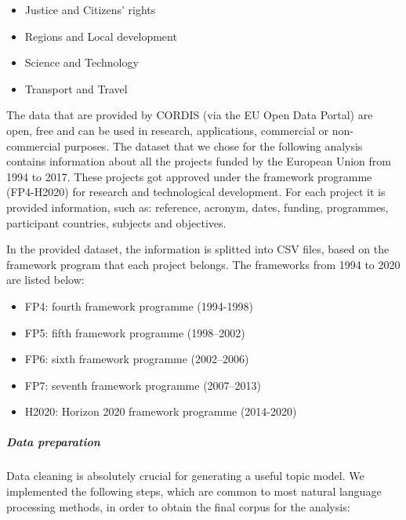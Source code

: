\documentclass[12pt]{report}
\begin{document}
\begin{itemize}
\begin{description}
	\end{description}
\item Justice and Citizens’ rights
\item Regions and Local development
\item Science and Technology
\item Transport and Travel
\end{itemize}

The data that are provided by CORDIS (via the EU Open Data Portal) are open, free and can be used in research, applications, commercial or non-commercial purposes. The dataset that we chose for the following analysis contains information about all the projects funded by the European Union from 1994 to 2017. These projects got approved under the framework programme (FP4-H2020) for research and technological development. For each project it is provided information, such as: reference, acronym, dates, funding, programmes, participant countries, subjects and objectives.

In the provided dataset, the information is splitted into CSV files, based on the framework program that each project belongs. The frameworks from 1994 to 2020 are listed below:

\begin{itemize}
\item FP4: fourth framework programme (1994-1998)
\item FP5: fifth framework programme (1998–2002)
\item FP6: sixth framework programme (2002–2006)
\item FP7: seventh framework programme (2007–2013)
\item H2020: Horizon 2020 framework programme (2014-2020)
\end{itemize}

\subparagraph{Data preparation}

Data cleaning is absolutely crucial for generating a useful topic model. We implemented the following steps, which are common to most natural language processing methods, in order to obtain the final corpus for the analysis:
\end{document}
